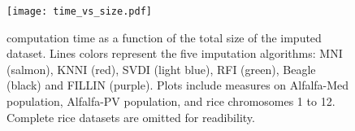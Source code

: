 \begin{figure}
\texttt{[image: time\_vs\_size.pdf]}
\caption[Computation times]{computation time as a function of the total size of the imputed dataset.
Lines colors represent the five imputation algorithms: MNI (salmon), KNNI (red), SVDI (light blue), RFI (green), Beagle (black) and FILLIN (purple).
Plots include measures on Alfalfa-Med population, Alfalfa-PV population, and rice chromosomes 1 to 12. Complete rice datasets are omitted for readibility.}
\label{fig:time_analysis}
\end{figure}
